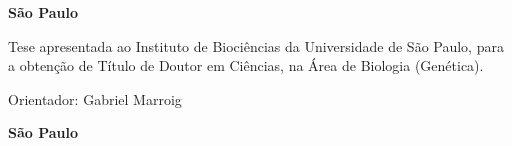 \pagestyle{empty}

\begin{titlepage}


\begin{center}
{\LARGE \nomedoaluno}
\par
\vspace{70pt}
{\Huge \titulo}
\par
\vspace{420pt}
\textbf{{\large São Paulo}\\
{\large \the\year}}
\end{center}
\end{titlepage}

\cleardoublepage

\pagestyle{fancy}



\thispagestyle{empty}

\begin{center}
{\LARGE \nomedoaluno}
\par
\vspace{200pt}
{\Huge \titulo}
\end{center}
\par
\vspace{90pt}
\hspace*{175pt}\parbox{7.6cm}{{\large Tese apresentada ao Instituto de Biociências da Universidade de São Paulo, para a obtenção de Título de Doutor em Ciências, na Área de Biologia (Genética).}}

\par
\vspace{1em}
\hspace*{175pt}\parbox{7.6cm}{{\large Orientador: Gabriel Marroig}}

\par
\vfill
\begin{center}
\textbf{{\large São Paulo}\\
{\large \the\year}}
\end{center}

